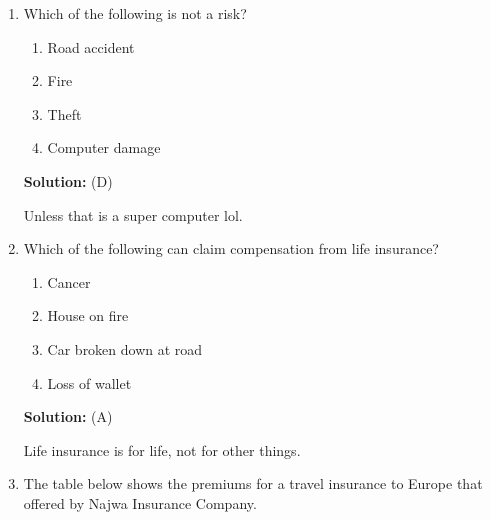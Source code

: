 \documentclass{report}
\newcommand{\sol}{

    \vspace{0.5em}\textbf{Solution:}\vspace{0.5em}}
\begin{document}
\onehalfspacing
\begin{enumerate}

    \item Which of the following is not a risk?
          \begin{enumerate}[label=(\Alph*)]
              \item Road accident
              \item Fire
              \item Theft
              \item Computer damage
          \end{enumerate}
          \sol{} (D)

          Unless that is a super computer lol. \vspace{0.5cm}

    \item Which of the following can claim compensation from life insurance?
          \begin{enumerate}[label=(\Alph*)]
              \item Cancer
              \item House on fire
              \item Car broken down at road
              \item Loss of wallet
          \end{enumerate}
          \sol{} (A)

          Life insurance is for life, not for other things. \vspace{0.5cm}

    \item The table below shows the premiums for a travel insurance to Europe that
          offered by Najwa Insurance Company.


\end{enumerate}
\end{document}
